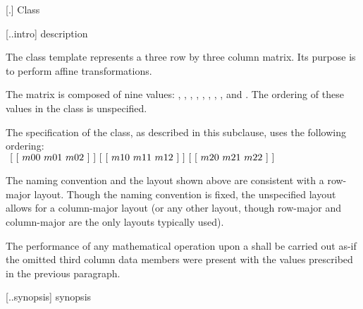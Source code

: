  [\iotwod.\matrixtwod] {Class }

 [\iotwod.\matrixtwod.intro] { description}

%
\pnum
The class template  represents a three row by three column matrix. Its purpose is to perform affine transformations.

\pnum
The matrix is composed of nine  values: , , , , , , , , and . The ordering of these  values in the  class is unspecified.

\pnum
The specification of the  class, as described in this subclause, uses the following ordering: \\
$
~[~[~m00~m01~m02~]~] \\
~[~[~m10~m11~m12~]~] \\
~[~[~m20~m21~m22~]~]$

\pnum
\begin{note}
The naming convention and the layout shown above are consistent with a row-major layout. Though the naming convention is fixed, the unspecified layout allows for a column-major layout (or any other layout, though row-major and column-major are the only layouts typically used).
\end{note}

\pnum
The performance of any mathematical operation upon a  shall be carried out as-if the omitted third column data members were present with the values prescribed in the previous paragraph.

 [\iotwod.\matrixtwod.synopsis] { synopsis}

